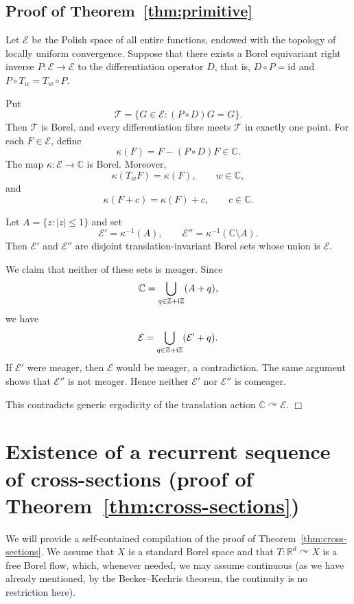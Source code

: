 \documentclass[11pt]{paper}
\newcommand{\bR}{\mathbb R}
\begin{document}
\subsection{Proof of Theorem~\ref{thm:primitive}}
Let $\mathcal E$ be the Polish space of all entire functions, endowed with the
topology of locally uniform convergence. Suppose that there exists a Borel
equivariant right inverse $P\colon \mathcal E\to\mathcal E$ to the differentiation
operator $D$, that is, $D\circ P=\mathrm{id}$ and $P\circ T_w=T_w\circ P$.

Put
\[
\mathcal T=\{G\in\mathcal E:(P\circ D)G=G\}.
\]
Then $\mathcal T$ is Borel, and every differentiation fibre meets $\mathcal T$
in exactly one point. For each $F\in\mathcal E$, define
\[
\kappa(F)=F-(P\circ D)F\in\mathbb C.
\]
The map $\kappa:\mathcal E\to\mathbb C$ is Borel. Moreover,
\[
\kappa(T_wF)=\kappa(F),\qquad w\in\mathbb C,
\]
and
\[
\kappa(F+c)=\kappa(F)+c,\qquad c\in\mathbb C.
\]

Let $A=\{z:|z|\le 1\}$ and set
\[
\mathcal E'=\kappa^{-1}(A),\qquad
\mathcal E''=\kappa^{-1}(\mathbb C\setminus A).
\]
Then $\mathcal E'$ and $\mathcal E''$ are disjoint translation-invariant Borel sets
whose union is $\mathcal E$.

We claim that neither of these sets is meager. Since
\[
\mathbb C=\bigcup_{q\in\mathbb Z+{\rm i}\mathbb Z}(A+q),
\]
we have
\[
\mathcal E=\bigcup_{q\in\mathbb Z+{\rm i}\mathbb Z}(\mathcal E'+q).
\]
If $\mathcal E'$ were meager, then $\mathcal E$ would be meager, a contradiction.
The same argument shows that $\mathcal E''$ is not meager. Hence neither $\mathcal E'$ nor
$\mathcal E''$ is comeager.

This contradicts generic ergodicity of the translation action $\mathbb C\curvearrowright\mathcal E$.
\hfill $\Box$


\appendix


\setcounter{theorem}{0}
\setcounter{lemma}{0}
\setcounter{claim}{0}
\setcounter{corollary}{0}


\section{Existence of a recurrent sequence of cross-sections
(proof of Theorem~\ref{thm:cross-sections})}
\label{app:rec-cross-sections}
We will provide a self-contained compilation of the proof of Theorem~\ref{thm:cross-sections}.  We
assume that $X$ is a standard Borel space and that $T\colon \bR^d \curvearrowright X$ is a free
Borel flow, which, whenever needed, we may assume continuous (as we have already mentioned, by the
Becker--Kechris theorem, the continuity is no restriction here).
\end{document}
